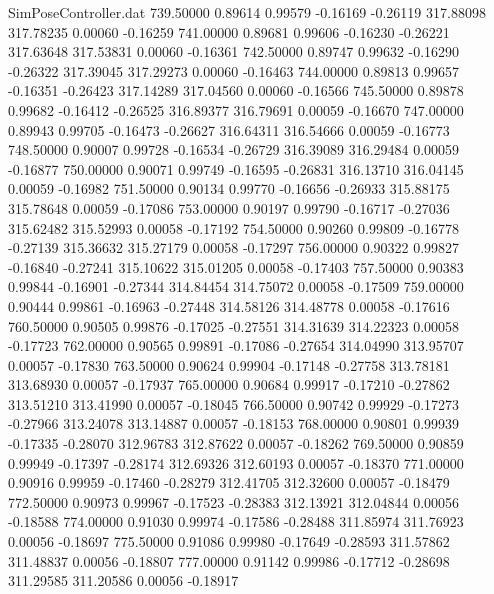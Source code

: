 \begin{filecontents}{SimPoseController.dat}
 739.50000    0.89614    0.99579    -0.16169   -0.26119  317.88098  317.78235    0.00060   -0.16259
 741.00000    0.89681    0.99606    -0.16230   -0.26221  317.63648  317.53831    0.00060   -0.16361
 742.50000    0.89747    0.99632    -0.16290   -0.26322  317.39045  317.29273    0.00060   -0.16463
 744.00000    0.89813    0.99657    -0.16351   -0.26423  317.14289  317.04560    0.00060   -0.16566
 745.50000    0.89878    0.99682    -0.16412   -0.26525  316.89377  316.79691    0.00059   -0.16670
 747.00000    0.89943    0.99705    -0.16473   -0.26627  316.64311  316.54666    0.00059   -0.16773
 748.50000    0.90007    0.99728    -0.16534   -0.26729  316.39089  316.29484    0.00059   -0.16877
 750.00000    0.90071    0.99749    -0.16595   -0.26831  316.13710  316.04145    0.00059   -0.16982
 751.50000    0.90134    0.99770    -0.16656   -0.26933  315.88175  315.78648    0.00059   -0.17086
 753.00000    0.90197    0.99790    -0.16717   -0.27036  315.62482  315.52993    0.00058   -0.17192
 754.50000    0.90260    0.99809    -0.16778   -0.27139  315.36632  315.27179    0.00058   -0.17297
 756.00000    0.90322    0.99827    -0.16840   -0.27241  315.10622  315.01205    0.00058   -0.17403
 757.50000    0.90383    0.99844    -0.16901   -0.27344  314.84454  314.75072    0.00058   -0.17509
 759.00000    0.90444    0.99861    -0.16963   -0.27448  314.58126  314.48778    0.00058   -0.17616
 760.50000    0.90505    0.99876    -0.17025   -0.27551  314.31639  314.22323    0.00058   -0.17723
 762.00000    0.90565    0.99891    -0.17086   -0.27654  314.04990  313.95707    0.00057   -0.17830
 763.50000    0.90624    0.99904    -0.17148   -0.27758  313.78181  313.68930    0.00057   -0.17937
 765.00000    0.90684    0.99917    -0.17210   -0.27862  313.51210  313.41990    0.00057   -0.18045
 766.50000    0.90742    0.99929    -0.17273   -0.27966  313.24078  313.14887    0.00057   -0.18153
 768.00000    0.90801    0.99939    -0.17335   -0.28070  312.96783  312.87622    0.00057   -0.18262
 769.50000    0.90859    0.99949    -0.17397   -0.28174  312.69326  312.60193    0.00057   -0.18370
 771.00000    0.90916    0.99959    -0.17460   -0.28279  312.41705  312.32600    0.00057   -0.18479
 772.50000    0.90973    0.99967    -0.17523   -0.28383  312.13921  312.04844    0.00056   -0.18588
 774.00000    0.91030    0.99974    -0.17586   -0.28488  311.85974  311.76923    0.00056   -0.18697
 775.50000    0.91086    0.99980    -0.17649   -0.28593  311.57862  311.48837    0.00056   -0.18807
 777.00000    0.91142    0.99986    -0.17712   -0.28698  311.29585  311.20586    0.00056   -0.18917

\end{filecontents}
